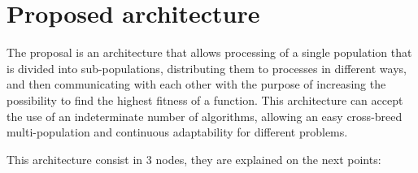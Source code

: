\documentclass[runningheads]{llncs}
\begin{document}
\section{Proposed architecture}
\label{sec:architecture}

The proposal is an architecture that allows processing of a single population
that is divided into sub-populations, distributing them to processes in different
ways, and then communicating with each other with the purpose of increasing the
possibility to find the highest fitness of a function. This architecture can accept
the use of an indeterminate number of algorithms, allowing an easy cross-breed multi-population 
and continuous adaptability for different problems. %

This architecture consist in 3 nodes, %
they are explained on the next points:
\end{document}
